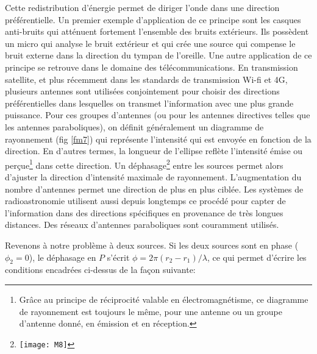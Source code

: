 Cette redistribution d'énergie permet de diriger l'onde dans une direction préférentielle. Un premier exemple d'application de ce principe sont les casques anti-bruits qui atténuent fortement l'ensemble des bruits extérieurs. Ils possèdent un micro qui analyse le bruit extérieur et qui crée une source qui compense le bruit externe dans la direction du tympan de l'oreille. Une autre application de ce principe se retrouve dans le domaine des télécommunications. En transmission satellite, et plus récemment dans les standards de transmission Wi-fi et 4G, plusieurs antennes sont utilisées conjointement pour choisir des directions préférentielles dans lesquelles on transmet l'information avec une plus grande puissance. Pour ces groupes d'antennes (ou pour les antennes directives telles que les antennes paraboliques), on définit généralement un diagramme de rayonnement (fig \ref{fm7}) qui représente l'intensité qui est envoyée en fonction de la direction. En d'autres termes, la longueur de l'ellipse reflète l'intensité émise ou perçue\footnote{Grâce au principe de réciprocité valable en électromagnétisme, ce diagramme de rayonnement est toujours le même, pour une antenne ou un groupe d'antenne donné, en émission et en réception.} dans cette direction.   Un déphasage\footnote{\texttt{[image: M8]}} entre les sources permet alors d'ajuster la direction d'intensité maximale de rayonnement. L'augmentation du nombre d'antennes permet une direction de plus en plus ciblée.
Les systèmes de radioastronomie utilisent aussi depuis longtemps ce procédé pour capter de l'information dans des directions spécifiques en provenance de très longues distances. Des réseaux d'antennes paraboliques sont couramment utilisés.

Revenons à notre problème à deux sources. Si les deux sources sont en phase ($\phi_2=0$), le déphasage en $P$ s'écrit $\phi=2\pi(r_2-r_1)/\lambda$, ce qui permet d'écrire les conditions encadrées ci-dessus de la façon suivante:

